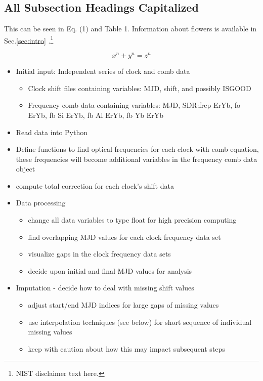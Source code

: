 \documentclass[
  12pt,
]{article}
\begin{document}
\subsection{All Subsection Headings Capitalized}\label{subsec:headingscap}

This can be seen in Eq. (1) and Table 1. Information about flowers is
available in Sec.\ref{sec:intro} .\footnote{NIST disclaimer text here.}

\begin{equation}
{x}^{n} + {y}^{n} = {z}^{n}
\end{equation}

\begin{itemize}
\item Initial input: Independent series of clock and comb data
\begin{itemize}
    \item Clock shift files containing variables: MJD, shift, and possibly ISGOOD 
    \item Frequency comb data containing variables: MJD, SDR:frep ErYb, fo ErYb, fb Si ErYb, fb Al ErYb, fb Yb ErYb
\end{itemize}
\item Read data into Python
\item Define functions to find optical frequencies for each clock with comb equation, these frequencies will become additional variables in the frequency comb data object 
\item compute total correction for each clock's shift data 
\item Data processing 
\begin{itemize}
    \item change all data variables to type float for high precision computing
    \item find overlapping MJD values for each clock frequency data set 
    \item visualize gaps in the clock frequency data sets 
    \item decide upon initial and final MJD values for analysis  
\end{itemize} 
\item Imputation -  decide how to deal with missing shift values
\begin{itemize}
    \item adjust start/end MJD indices for large gaps of missing values 
    \item use interpolation techniques (see below) for short sequence of individual missing values 
    \item keep with caution about how this may impact subsequent steps 

\end{itemize}
\end{itemize}
\end{document}
